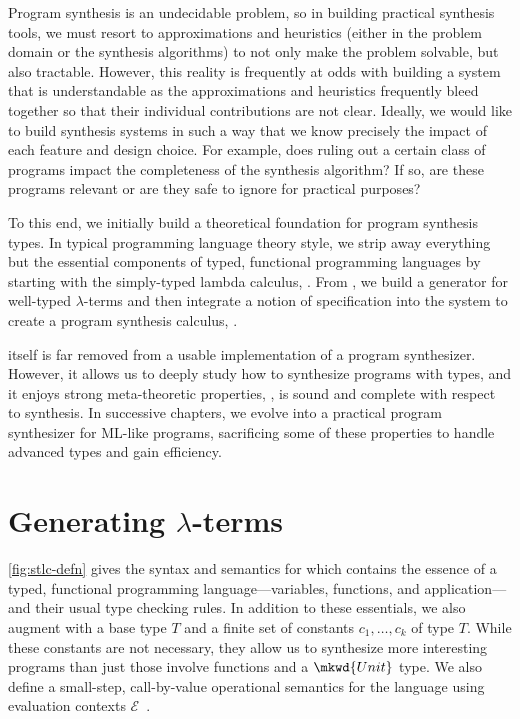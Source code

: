 Program synthesis is an undecidable problem, so in building practical synthesis tools, we must resort to approximations and heuristics (either in the problem domain or the synthesis algorithms) to not only make the problem solvable, but also tractable.
However, this reality is frequently at odds with building a system that is understandable as the approximations and heuristics frequently bleed together so that their individual contributions are not clear.
Ideally, we would like to build synthesis systems in such a way that we know precisely the impact of each feature and design choice.
For example, does ruling out a certain class of programs impact the completeness of the synthesis algorithm?
If so, are these programs relevant or are they safe to ignore for practical purposes?

To this end, we initially build a theoretical foundation for program synthesis types.
In typical programming language theory style, we strip away everything but the essential components of typed, functional programming languages by starting with the simply-typed lambda calculus, \stlc{}.
From \stlc{}, we build a generator for well-typed $λ$-terms and then integrate a notion of specification into the system to create a program synthesis calculus, \lsyn{}.

\lsyn{} itself is far removed from a usable implementation of a program synthesizer.
However, it allows us to deeply study how to synthesize programs with types, and it enjoys strong meta-theoretic properties, \ie, \lsyn{} is sound and complete with respect to synthesis.
In successive chapters, we evolve \lsyn{} into a practical program synthesizer for ML-like programs, sacrificing some of these properties to handle advanced types and gain efficiency.



\section{Generating \texorpdfstring{$λ$}{λ}-terms}
\label{sec:generating-lambda-terms}

\autoref{fig:stlc-defn} gives the syntax and semantics for \stlc{} which contains the essence of a typed, functional programming language---variables, functions, and application---and their usual type checking rules.
In addition to these essentials, we also augment \stlc{} with a base type $T$ and a finite set of constants $c_1, …, c_k$ of type $T$.
While these constants are not necessary, they allow us to synthesize more interesting programs than just those involve functions and a $\mkwd{Unit}$ type.
We also define a small-step, call-by-value operational semantics for the language using evaluation contexts $ℰ$~.

